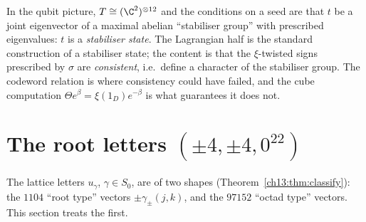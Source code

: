 \begin{remark}
In the qubit picture, $T\cong(\C^2)^{\otimes12}$ and the conditions on a seed are that $t$ be a joint
eigenvector of a maximal abelian ``stabiliser group'' with prescribed eigenvalues: $t$ is a
\emph{stabiliser state}. The Lagrangian half is the standard construction of a stabiliser state; the
content is that the $\xi$-twisted signs prescribed by $\sigma$ are \emph{consistent}, i.e.\ define a character
of the stabiliser group. The codeword relation is where consistency could have failed, and the cube
computation $\Theta e^\beta=\xi(1_D)e^{-\beta}$ is what guarantees it does not.
\end{remark}

\section{\texorpdfstring{The root letters $(\pm4,\pm4,0^{22})$}{The root letters (pm4,pm4,022)}}\label{ch13:sec:root}

The lattice letters $u_\gamma$, $\gamma\in S_0$, are of two shapes (Theorem~\ref{ch13:thm:classify}): the
$1104$ ``root type'' vectors $\pm\gamma_\pm(j,k)$, and the $97152$ ``octad type'' vectors. This section treats
the first.

